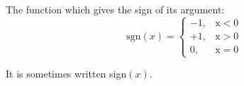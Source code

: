 The function which gives the sign of its argument:
\[ \mathrm{sgn}(x) =  
\left \{ 
\begin{array}{cc} 
  -1, & \mathrm{x<0} \\
  +1, & \mathrm{x>0} \\
  0, & \mathrm{x=0} 
\end{array} 
\right . \]
\par
It is sometimes written sign$(x)$.